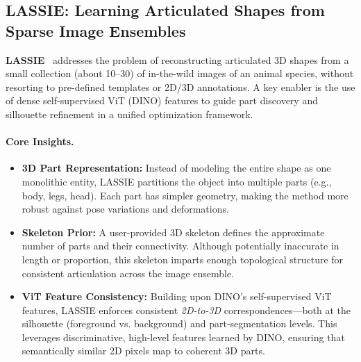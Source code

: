 \documentclass[11pt]{article}
\begin{document}
\subsection{LASSIE: Learning Articulated Shapes from Sparse Image Ensembles}
\label{subsec:lassie}

\textbf{LASSIE}~\cite{yao2022lassie} addresses the problem of reconstructing articulated 3D shapes from a small collection (about 10–30) of in-the-wild images of an animal species, without resorting to pre-defined templates or 2D/3D annotations. A key enabler is the use of dense self-supervised ViT (DINO) features to guide part discovery and silhouette refinement in a unified optimization framework.

\paragraph{Core Insights.}
\begin{itemize}
    \item \textbf{3D Part Representation:} Instead of modeling the entire shape as one monolithic entity, LASSIE partitions the object into multiple parts (e.g., body, legs, head). Each part has simpler geometry, making the method more robust against pose variations and deformations. 
    \item \textbf{Skeleton Prior:} A user-provided 3D skeleton defines the approximate number of parts and their connectivity. Although potentially inaccurate in length or proportion, this skeleton imparts enough topological structure for consistent articulation across the image ensemble.
    \item \textbf{ViT Feature Consistency:} Building upon DINO’s self-supervised ViT features, LASSIE enforces consistent \emph{2D-to-3D} correspondences—both at the silhouette (foreground vs. background) and part-segmentation levels. This leverages discriminative, high-level features learned by DINO, ensuring that semantically similar 2D pixels map to coherent 3D parts.
\end{itemize}
\end{document}
